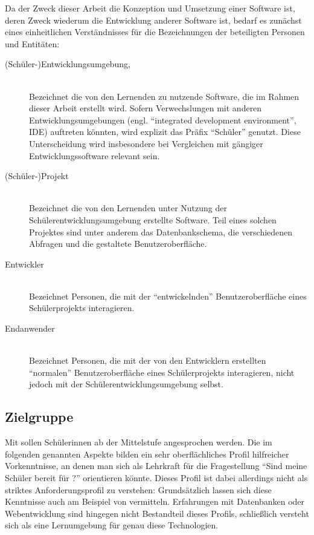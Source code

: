 Da der Zweck dieser Arbeit die Konzeption und Umsetzung einer Software ist, deren Zweck wiederum die Entwicklung anderer Software ist, bedarf es zunächst eines einheitlichen Verständnisses für die Bezeichnungen der beteiligten Personen und Entitäten:

\begin{description}
\item[(Schüler-)Entwicklungsumgebung, \idename{}] \hfill\\
  Bezeichnet die von den Lernenden zu nutzende Software, die im Rahmen dieser Arbeit erstellt wird. Sofern Verwechslungen mit anderen Entwicklungsumgebungen (engl. ``integrated development environment'', IDE) auftreten könnten, wird explizit das Präfix ``Schüler'' genutzt. Diese Unterscheidung wird insbesondere bei Vergleichen mit gängiger Entwicklungssoftware relevant sein.
\item[(Schüler-)Projekt] \hfill\\
  Bezeichnet die von den Lernenden unter Nutzung der Schülerentwicklungsumgebung erstellte Software. Teil eines solchen Projektes sind unter anderem das Datenbankschema, die verschiedenen Abfragen und die gestaltete Benutzeroberfläche.
\item[Entwickler] \hfill\\
  Bezeichnet Personen, die mit der ``entwickelnden'' Benutzeroberfläche eines Schülerprojekts interagieren.
\item[Endanwender] \hfill\\
  Bezeichnet Personen, die mit der von den Entwicklern erstellten ``normalen'' Benutzeroberfläche eines Schülerprojekts interagieren, nicht jedoch mit der Schülerentwicklungsumgebung selbst.
\end{description}

\subsection{Zielgruppe}
\label{sec:target-audience}

Mit \idename{} sollen Schülerinnen ab der Mittelstufe angesprochen werden. Die im folgenden genannten Aspekte bilden ein sehr oberflächliches Profil hilfreicher Vorkenntnisse, an denen man sich als Lehrkraft für die Fragestellung "`Sind meine Schüler bereit für \idename{}?"' orientieren könnte. Dieses Profil ist dabei allerdings nicht als striktes Anforderungsprofil zu verstehen: Grundsätzlich lassen sich diese Kenntnisse auch am Beispiel von \idename{} vermitteln. Erfahrungen mit Datenbanken oder Webentwicklung sind hingegen nicht Bestandteil dieses Profils, schließlich versteht sich \idename{} als eine Lernumgebung für genau diese Technologien.

